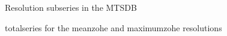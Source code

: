 


\begin{figure}[tp]
  \centering
  
  \caption{Resolution subseries in the MTSDB}
  \label{fig:exemple:4mrd}
\end{figure}








\begin{figure}[tp]
  \centering
  
  \caption{totalseries for the meanzohe and maximumzohe
    resolutions}
  \label{fig:exemple:4mrdtot}
\end{figure}


